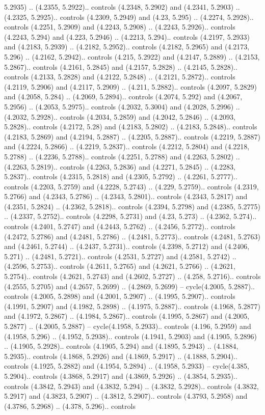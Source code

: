 5.2935) .. (4.2355, 5.2922).. controls (4.2348, 5.2902) and (4.2341, 5.2903) .. (4.2325, 5.2925).. controls (4.2309, 5.2949) and (4.23, 5.295) .. (4.2274, 5.2928).. controls (4.2251, 5.2909) and (4.2243, 5.2908) .. (4.2243, 5.2926).. controls (4.2243, 5.294) and (4.223, 5.2946) .. (4.2213, 5.294).. controls (4.2197, 5.2933) and (4.2183, 5.2939) .. (4.2182, 5.2952).. controls (4.2182, 5.2965) and (4.2173, 5.296) .. (4.2162, 5.2942).. controls (4.215, 5.2922) and (4.2147, 5.2889) .. (4.2153, 5.2867).. controls (4.2161, 5.2845) and (4.2157, 5.2828) .. (4.2145, 5.2828).. controls (4.2133, 5.2828) and (4.2122, 5.2848) .. (4.2121, 5.2872).. controls (4.2119, 5.2906) and (4.2117, 5.2909) .. (4.211, 5.2882).. controls (4.2097, 5.2829) and (4.2058, 5.284) .. (4.2069, 5.2894).. controls (4.2074, 5.292) and (4.2067, 5.2956) .. (4.2053, 5.2975).. controls (4.2032, 5.3004) and (4.2028, 5.2996) .. (4.2032, 5.2928).. controls (4.2034, 5.2859) and (4.2042, 5.2846) .. (4.2093, 5.2828).. controls (4.2172, 5.28) and (4.2183, 5.2802) .. (4.2183, 5.2848).. controls (4.2183, 5.2869) and (4.2194, 5.2887) .. (4.2205, 5.2887).. controls (4.2219, 5.2887) and (4.2224, 5.2866) .. (4.2219, 5.2837).. controls (4.2212, 5.2804) and (4.2218, 5.2788) .. (4.2236, 5.2788).. controls (4.2251, 5.2788) and (4.2263, 5.2802) .. (4.2263, 5.2819).. controls (4.2263, 5.2836) and (4.2271, 5.2845) .. (4.2283, 5.2837).. controls (4.2315, 5.2818) and (4.2305, 5.2792) .. (4.2261, 5.2777).. controls (4.2203, 5.2759) and (4.2228, 5.2743) .. (4.229, 5.2759).. controls (4.2319, 5.2766) and (4.2343, 5.2786) .. (4.2343, 5.2801).. controls (4.2343, 5.2817) and (4.2351, 5.2824) .. (4.2362, 5.2818).. controls (4.2394, 5.2798) and (4.2385, 5.2775) .. (4.2337, 5.2752).. controls (4.2298, 5.2731) and (4.23, 5.273) .. (4.2362, 5.274).. controls (4.2401, 5.2747) and (4.2443, 5.2762) .. (4.2456, 5.2772).. controls (4.2472, 5.2786) and (4.2481, 5.2786) .. (4.2481, 5.2773).. controls (4.2481, 5.2763) and (4.2461, 5.2744) .. (4.2437, 5.2731).. controls (4.2398, 5.2712) and (4.2406, 5.271) .. (4.2481, 5.2721).. controls (4.2531, 5.2727) and (4.2581, 5.2742) .. (4.2596, 5.2753).. controls (4.2611, 5.2765) and (4.2621, 5.2766) .. (4.2621, 5.2754).. controls (4.2621, 5.2743) and (4.2602, 5.2727) .. (4.258, 5.2716).. controls (4.2555, 5.2705) and (4.2657, 5.2699) .. (4.2869, 5.2699) -- cycle(4.2005, 5.2887).. controls (4.2005, 5.2898) and (4.2001, 5.2907) .. (4.1995, 5.2907).. controls (4.1991, 5.2907) and (4.1982, 5.2898) .. (4.1975, 5.2887).. controls (4.1968, 5.2877) and (4.1972, 5.2867) .. (4.1984, 5.2867).. controls (4.1995, 5.2867) and (4.2005, 5.2877) .. (4.2005, 5.2887) -- cycle(4.1958, 5.2933).. controls (4.196, 5.2959) and (4.1958, 5.296) .. (4.1952, 5.2938).. controls (4.1941, 5.2903) and (4.1905, 5.2896) .. (4.1905, 5.2928).. controls (4.1905, 5.294) and (4.1895, 5.2943) .. (4.1884, 5.2935).. controls (4.1868, 5.2926) and (4.1869, 5.2917) .. (4.1888, 5.2904).. controls (4.1925, 5.2882) and (4.1954, 5.2894) .. (4.1958, 5.2933) -- cycle(4.385, 5.2904).. controls (4.3868, 5.2917) and (4.3869, 5.2926) .. (4.3854, 5.2935).. controls (4.3842, 5.2943) and (4.3832, 5.294) .. (4.3832, 5.2928).. controls (4.3832, 5.2917) and (4.3823, 5.2907) .. (4.3812, 5.2907).. controls (4.3793, 5.2958) and (4.3786, 5.2968) .. (4.378, 5.296).. controls 